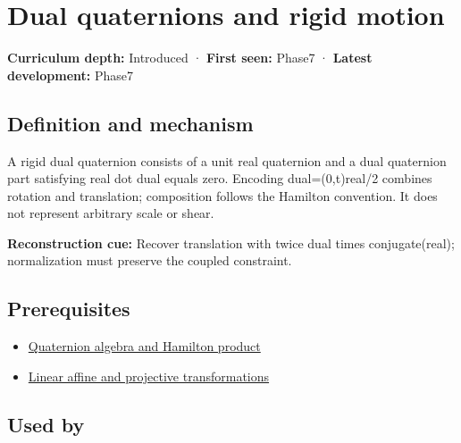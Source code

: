 \hypertarget{appendix-d1ea57347893}{}\label{referencestart:appendix-d1ea57347893}
\section{Dual quaternions and rigid motion}\label{appendix-d1ea57347893-dual-quaternions-and-rigid-motion}

\hypertarget{appendix-d1ea57347893-dual-quaternions-and-rigid-motion}{}

\textbf{Curriculum depth:} Introduced · \textbf{First seen:} Phase7 · \textbf{Latest development:} Phase7

\begin{allmightroledefinition}

\subsection{Definition and mechanism}\label{appendix-d1ea57347893-definition-and-mechanism}

\hypertarget{appendix-d1ea57347893-definition-and-mechanism}{}

A rigid dual quaternion consists of a unit real quaternion and a dual quaternion part satisfying real dot dual equals zero. Encoding dual=(0,t)real/2 combines rotation and translation; composition follows the Hamilton convention. It does not represent arbitrary scale or shear.

\end{allmightroledefinition}

\textbf{Reconstruction cue:} Recover translation with twice dual times conjugate(real); normalization must preserve the coupled constraint.

\subsection{Prerequisites}\label{appendix-d1ea57347893-prerequisites}

\hypertarget{appendix-d1ea57347893-prerequisites}{}

\begin{itemize}
\tightlist
\item
  \hyperref[appendix-965d9260eeab]{Quaternion algebra and Hamilton product}
\item
  \hyperref[appendix-0bf0ca73f735]{Linear affine and projective transformations}
\end{itemize}

\subsection{Used by}\label{appendix-d1ea57347893-used-by}

